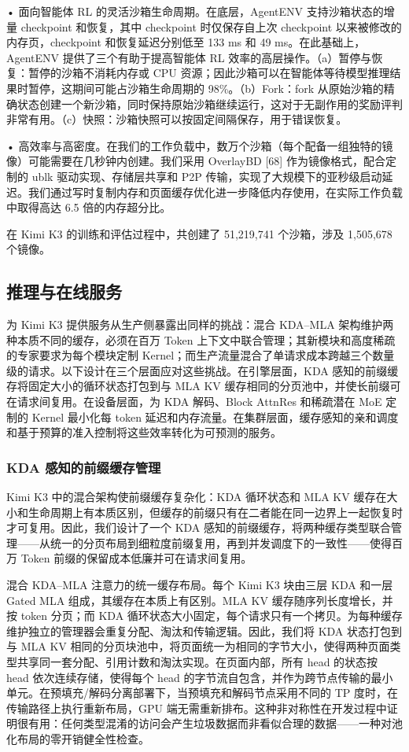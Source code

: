 • 面向智能体 RL 的灵活沙箱生命周期。在底层，AgentENV 支持沙箱状态的增量 checkpoint 和恢复，其中 checkpoint 时仅保存自上次 checkpoint 以来被修改的内存页，checkpoint 和恢复延迟分别低至 133 ms 和 49 ms。在此基础上，AgentENV 提供了三个有助于提高智能体 RL 效率的高层操作。（a）暂停与恢复：暂停的沙箱不消耗内存或 CPU 资源；因此沙箱可以在智能体等待模型推理结果时暂停，这期间可能占沙箱生命周期的 98\%。（b）Fork：fork 从原始沙箱的精确状态创建一个新沙箱，同时保持原始沙箱继续运行，这对于无副作用的奖励评判非常有用。（c）快照：沙箱快照可以按固定间隔保存，用于错误恢复。

• 高效率与高密度。在我们的工作负载中，数万个沙箱（每个配备一组独特的镜像）可能需要在几秒钟内创建。我们采用 OverlayBD {[}68{]} 作为镜像格式，配合定制的 ublk 驱动实现、存储层共享和 P2P 传输，实现了大规模下的亚秒级启动延迟。我们通过写时复制内存和页面缓存优化进一步降低内存使用，在实际工作负载中取得高达 6.5 倍的内存超分比。

在 Kimi K3 的训练和评估过程中，共创建了 51,219,741 个沙箱，涉及 1,505,678 个镜像。

\subsection{推理与在线服务}\label{inference-and-online-serving}

为 Kimi K3 提供服务从生产侧暴露出同样的挑战：混合 KDA--MLA 架构维护两种本质不同的缓存，必须在百万 Token 上下文中联合管理；其新模块和高度稀疏的专家要求为每个模块定制 Kernel；而生产流量混合了单请求成本跨越三个数量级的请求。以下设计在三个层面应对这些挑战。在引擎层面，KDA 感知的前缀缓存将固定大小的循环状态打包到与 MLA KV 缓存相同的分页池中，并使长前缀可在请求间复用。在设备层面，为 KDA 解码、Block AttnRes 和稀疏潜在 MoE 定制的 Kernel 最小化每 token 延迟和内存流量。在集群层面，缓存感知的亲和调度和基于预算的准入控制将这些效率转化为可预测的服务。

\subsubsection{KDA 感知的前缀缓存管理}\label{kda-aware-prefix-cache-management}

Kimi K3 中的混合架构使前缀缓存复杂化：KDA 循环状态和 MLA KV 缓存在大小和生命周期上有本质区别，但缓存的前缀只有在二者能在同一边界上一起恢复时才可复用。因此，我们设计了一个 KDA 感知的前缀缓存，将两种缓存类型联合管理——从统一的分页布局到细粒度前缀复用，再到并发调度下的一致性——使得百万 Token 前缀的保留成本低廉并可在请求间复用。

混合 KDA--MLA 注意力的统一缓存布局。每个 Kimi K3 块由三层 KDA 和一层 Gated MLA 组成，其缓存在本质上有区别。MLA KV 缓存随序列长度增长，并按 token 分页；而 KDA 循环状态大小固定，每个请求只有一个拷贝。为每种缓存维护独立的管理器会重复分配、淘汰和传输逻辑。因此，我们将 KDA 状态打包到与 MLA KV 相同的分页块池中，将页面统一为相同的字节大小，使得两种页面类型共享同一套分配、引用计数和淘汰实现。在页面内部，所有 head 的状态按 head 依次连续存储，使得每个 head 的字节流自包含，并作为跨节点传输的最小单元。在预填充/解码分离部署下，当预填充和解码节点采用不同的 TP 度时，在传输路径上执行重新布局，GPU 端无需重新排布。这种非对称性在开发过程中证明很有用：任何类型混淆的访问会产生垃圾数据而非看似合理的数据——一种对池化布局的零开销健全性检查。

